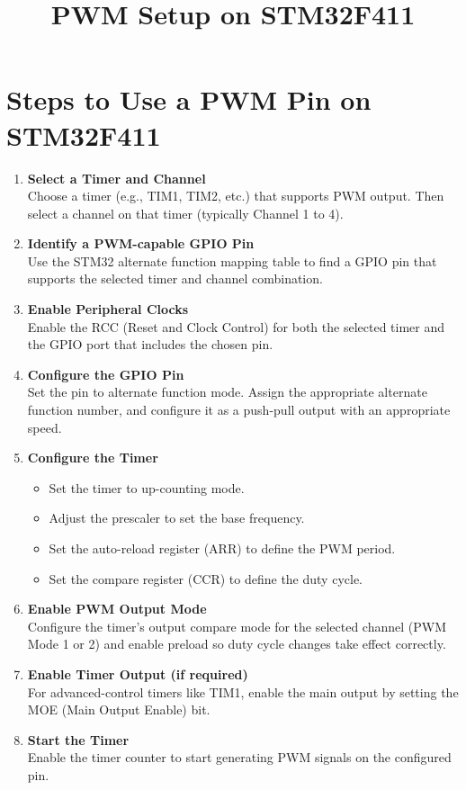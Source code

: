 \documentclass[12pt]{article}
\title{PWM Setup on STM32F411}
\author{}
\date{}
\begin{document}
\maketitle

\section*{Steps to Use a PWM Pin on STM32F411}

\begin{enumerate}[label=\textbf{Step \arabic*:}]
    \item \textbf{Select a Timer and Channel} \\
    Choose a timer (e.g., TIM1, TIM2, etc.) that supports PWM output. Then select a channel on that timer (typically Channel 1 to 4).

    \item \textbf{Identify a PWM-capable GPIO Pin} \\
    Use the STM32 alternate function mapping table to find a GPIO pin that supports the selected timer and channel combination.

    \item \textbf{Enable Peripheral Clocks} \\
    Enable the RCC (Reset and Clock Control) for both the selected timer and the GPIO port that includes the chosen pin.

    \item \textbf{Configure the GPIO Pin} \\
    Set the pin to alternate function mode. Assign the appropriate alternate function number, and configure it as a push-pull output with an appropriate speed.

    \item \textbf{Configure the Timer} 
        \begin{itemize}[label=--]
        \item Set the timer to up-counting mode.
        \item Adjust the prescaler to set the base frequency.
        \item Set the auto-reload register (ARR) to define the PWM period.
        \item Set the compare register (CCR) to define the duty cycle.
    \end{itemize}

    \item \textbf{Enable PWM Output Mode} \\
    Configure the timer's output compare mode for the selected channel (PWM Mode 1 or 2) and enable preload so duty cycle changes take effect correctly.

    \item \textbf{Enable Timer Output (if required)} \\
    For advanced-control timers like TIM1, enable the main output by setting the MOE (Main Output Enable) bit.

    \item \textbf{Start the Timer} \\
    Enable the timer counter to start generating PWM signals on the configured pin.
\end{enumerate}
\end{document}
